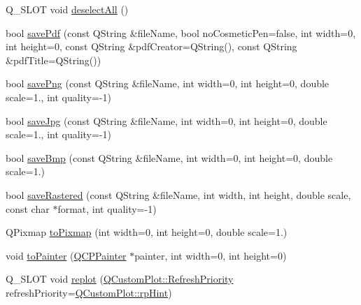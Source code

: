 \begin{DoxyCompactItemize}
\item 
Q\+\_\+\+S\+L\+OT void \hyperlink{class_q_custom_plot_a9d4808ab925b003054085246c92a257c}{deselect\+All} ()
\item 
bool \hyperlink{class_q_custom_plot_a632da44c6d94ea8b271eb483b08b5114}{save\+Pdf} (const Q\+String \&file\+Name, bool no\+Cosmetic\+Pen=false, int width=0, int height=0, const Q\+String \&pdf\+Creator=Q\+String(), const Q\+String \&pdf\+Title=Q\+String())
\item 
bool \hyperlink{class_q_custom_plot_a7636261aff1f6d25c9da749ece3fc8b8}{save\+Png} (const Q\+String \&file\+Name, int width=0, int height=0, double scale=1., int quality=-\/1)
\item 
bool \hyperlink{class_q_custom_plot_a490c722092d1771e8ce4a7a73dfd84ab}{save\+Jpg} (const Q\+String \&file\+Name, int width=0, int height=0, double scale=1., int quality=-\/1)
\item 
bool \hyperlink{class_q_custom_plot_a6629d9e8e6da4bf18055ee0257fdce9a}{save\+Bmp} (const Q\+String \&file\+Name, int width=0, int height=0, double scale=1.)
\item 
bool \hyperlink{class_q_custom_plot_ab528b84cf92baabe29b1d0ef2f77c93e}{save\+Rastered} (const Q\+String \&file\+Name, int width, int height, double scale, const char $\ast$format, int quality=-\/1)
\item 
Q\+Pixmap \hyperlink{class_q_custom_plot_aabb974d71ce96c137dc04eb6eab844fe}{to\+Pixmap} (int width=0, int height=0, double scale=1.)
\item 
void \hyperlink{class_q_custom_plot_a1be68d5c0f1e086d6374d1340a193fb9}{to\+Painter} (\hyperlink{class_q_c_p_painter}{Q\+C\+P\+Painter} $\ast$painter, int width=0, int height=0)
\item 
Q\+\_\+\+S\+L\+OT void \hyperlink{class_q_custom_plot_a606fd384b2a637ce2c24899bcbde77d6}{replot} (\hyperlink{class_q_custom_plot_a45d61392d13042e712a956d27762aa39}{Q\+Custom\+Plot\+::\+Refresh\+Priority} refresh\+Priority=\hyperlink{class_q_custom_plot_a45d61392d13042e712a956d27762aa39adfa1f2387617168d9299f4c8ad15b332}{Q\+Custom\+Plot\+::rp\+Hint})
\end{DoxyCompactItemize}
